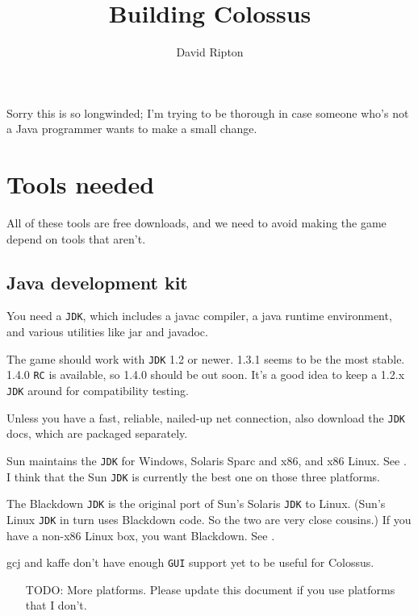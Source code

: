 \documentclass{article}
\begin{document}

\title{Building Colossus}

\author{David Ripton}

\maketitle

Sorry this is so longwinded; I'm trying to be thorough in case 
someone who's not a Java programmer wants to make a small change.

\section{Tools needed}

All of these tools are free downloads, and we need to avoid making 
the game depend on tools that aren't.

\subsection{Java development kit}

You need a \texttt{JDK}, which includes a javac compiler, a java runtime environment, 
and various utilities like jar and javadoc.

The game should work with \texttt{JDK} 1.2 or newer.  1.3.1 seems to be 
the most stable.  1.4.0 \texttt{RC} is available, so 1.4.0 should be out soon.
It's a good idea to keep a 1.2.x \texttt{JDK} around for compatibility testing.

Unless you have a fast, reliable, nailed-up net connection, also 
download the \texttt{JDK} docs, which are packaged separately.

Sun maintains the \texttt{JDK} for Windows, Solaris Sparc and x86, and x86 Linux.  
See \cite{SUNJDK}. I think that the Sun \texttt{JDK} is currently
the best one on those three platforms.

The Blackdown \texttt{JDK} is the original port of Sun's Solaris \texttt{JDK} to Linux.  
(Sun's Linux \texttt{JDK} in turn uses Blackdown code.  So the two are very close
cousins.)  If you have a non-x86 Linux box, you want Blackdown.
See \cite{BLACKDOWNJDK}.

gcj and kaffe don't have enough \texttt{GUI} support yet to be useful for Colossus.

\begin{itemize}
\item[TODO:]  More platforms.  Please update this document if you use
platforms that I don't.
\end{itemize}
\end{document}
